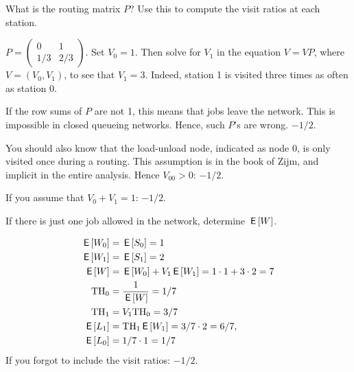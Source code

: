 \begin{exercise}[201804]
What is the routing matrix $P$? Use this to compute the visit ratios at each station.
\begin{solution}
 $P=
 \begin{pmatrix}
 0 & 1 \\
1/3 & 2/3
 \end{pmatrix}
$. Set $V_0=1$. Then solve for $V_1$ in the equation $V = VP$, where $V=(V_0, V_1)$, to see that $V_1=3$. Indeed, station 1 is visited three times as often as station 0. 

If the row sums of $P$ are not 1, this means that jobs leave the network. This is impossible in closed queueing networks. Hence, such $P$'s are wrong. $-1/2$.

You should also know that the load-unload node, indicated as node 0, is only visited once during a routing. This assumption is in the book of Zijm, and implicit in the entire analysis. Hence $V_{00}>0$: $-1/2$.

If you assume that $V_0+V_1=1$: $-1/2$. 

\end{solution}
\end{exercise}

\begin{exercise}[201804]
 If there is just one job allowed in the network, determine $\,\mathsf{E}\left[W\right]$.
\begin{solution}
 \begin{align*}
 \,\mathsf{E}\left[W_0\right] &= \,\mathsf{E}\left[S_0\right] = 1\\ 
 \,\mathsf{E}\left[W_1\right] &= \,\mathsf{E}\left[S_1\right] = 2\\
\,\mathsf{E}\left[W\right] &= \,\mathsf{E}\left[W_0\right] + V_1 \,\mathsf{E}\left[W_1\right] = 1\cdot 1 + 3 \cdot 2 = 7\\
\mathrm{TH}_0 &= \frac{1}{\,\mathsf{E}\left[W\right]} = 1/7\\
\mathrm{TH}_1&= V_1 \mathrm{TH}_0 = 3/7\\
\,\mathsf{E}\left[L_1\right] &= \mathrm{TH}_1 \,\mathsf{E}\left[W_1\right] = 3/7\cdot 2 = 6/7,\\
\,\mathsf{E}\left[L_0\right] &= 1/7\cdot 1 = 1/7
 \end{align*}
If you forgot to include the visit ratios: $-1/2$. 
\end{solution}
\end{exercise}

